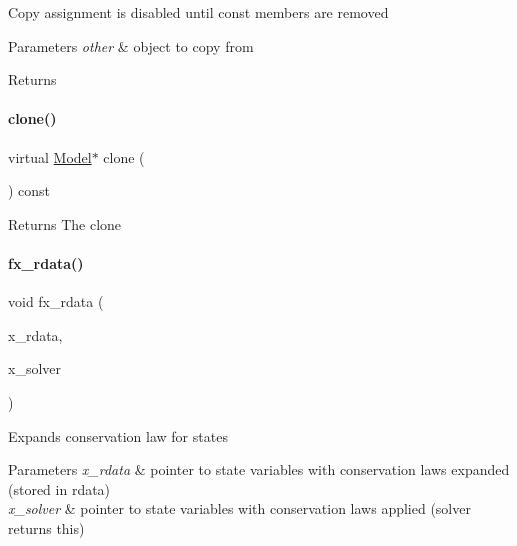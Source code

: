 Copy assignment is disabled until const members are removed 
\begin{DoxyParams}{Parameters}
{\em other} & object to copy from \\
\hline
\end{DoxyParams}
\begin{DoxyReturn}{Returns}

\end{DoxyReturn}
\mbox{\label{classamici_1_1_model_a109f753bb5889d6563476826f5a3666d}} 
\paragraph{\texorpdfstring{clone()}{clone()}}
{\footnotesize\ttfamily virtual \mbox{\hyperlink{classamici_1_1_model}{Model}}$\ast$ clone (\begin{DoxyParamCaption}{ }\end{DoxyParamCaption}) const\hspace{0.3cm}{\ttfamily [pure virtual]}}

\begin{DoxyReturn}{Returns}
The clone 
\end{DoxyReturn}
\mbox{\label{classamici_1_1_model_a335850c2d4843d99cb03bb6101cf282d}} 
\paragraph{\texorpdfstring{fx\_rdata()}{fx\_rdata()}\hspace{0.1cm}{\footnotesize\ttfamily [1/2]}}
{\footnotesize\ttfamily void fx\+\_\+rdata (\begin{DoxyParamCaption}\item[{\mbox{\hyperlink{classamici_1_1_ami_vector}{Ami\+Vector}} $\ast$}]{x\+\_\+rdata,  }\item[{const \mbox{\hyperlink{classamici_1_1_ami_vector}{Ami\+Vector}} $\ast$}]{x\+\_\+solver }\end{DoxyParamCaption})}

Expands conservation law for states 
\begin{DoxyParams}{Parameters}
{\em x\+\_\+rdata} & pointer to state variables with conservation laws expanded (stored in rdata) \\
\hline
{\em x\+\_\+solver} & pointer to state variables with conservation laws applied (solver returns this) \\
\hline
\end{DoxyParams}


